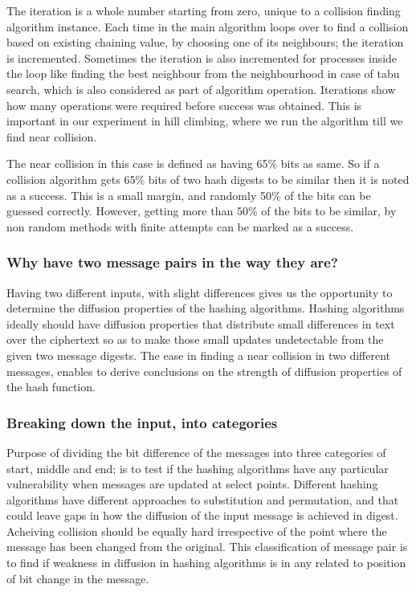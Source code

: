The iteration is a whole number starting from zero, unique to a collision finding algorithm instance. Each time in
the main algorithm loops over to find a collision based on existing chaining value, by choosing one of its
neighbours; the iteration is incremented. Sometimes the iteration is also incremented for processes inside the
loop like finding the best neighbour from the neighbourhood in case of tabu search, which is also considered as
part of algorithm operation. Iterations show how many operations were required before success was obtained. This
is important in our experiment in hill climbing, where we run the algorithm till we find near collision.

The near collision in this case is defined as having 65\% bits as same. So if a collision algorithm gets 65\% bits
of two hash digests to be similar then it is noted as a success. This is a small margin, and randomly 50\% of the
bits can be guessed correctly. However, getting more than 50\% of the bits to be similar, by non random methods with
finite attempts can be marked as a success. 

\subsubsection{Why have two message pairs in the way they are?}
Having two different inputs, with slight differences gives us the opportunity to determine the diffusion properties
of the hashing algorithms. Hashing algorithms ideally should have diffusion properties that distribute small 
differences in text over the ciphertext so as to make those small updates undetectable from the given two message
digests. The ease in finding a near collision in two different messages, enables to derive conclusions on the
strength of diffusion properties of the hash function.

\subsubsection{Breaking down the input, into categories}
Purpose of dividing the bit difference of the messages into three categories of start, middle and end; is to test
if the hashing algorithms have any particular vulnerability when messages are updated at select points. Different
hashing algorithms have different approaches to substitution and permutation, and that could leave gaps in how
the diffusion of the input message is achieved in digest. Acheiving collision should be equally hard irrespective
of the point where the message has been changed from the original. This classification of message pair is to
find if weakness in diffusion in hashing algorithms is in any related to position of bit change in the message.

